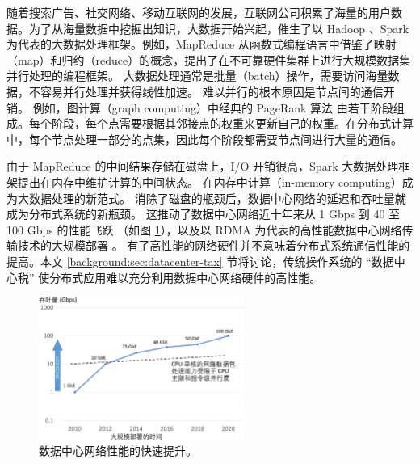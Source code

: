 随着搜索广告、社交网络、移动互联网的发展，互联网公司积累了海量的用户数据。为了从海量数据中挖掘出知识，大数据开始兴起，催生了以 Hadoop \cite{white2012hadoop}、Spark \cite{zaharia2010spark} 为代表的大数据处理框架。例如，MapReduce \cite{dean2008mapreduce} 从函数式编程语言中借鉴了映射（map）和归约（reduce）的概念，提出了在不可靠硬件集群上进行大规模数据集并行处理的编程框架。
大数据处理通常是批量（batch）操作，需要访问海量数据，不容易并行处理并获得线性加速。
难以并行的根本原因是节点间的通信开销。
例如，图计算（graph computing）中经典的 PageRank 算法 \cite{page1999pagerank} 由若干阶段组成。每个阶段，每个点需要根据其邻接点的权重来更新自己的权重。在分布式计算中，每个节点处理一部分的点集，因此每个阶段都需要节点间进行大量的通信。

由于 MapReduce 的中间结果存储在磁盘上，I/O 开销很高，Spark \cite{zaharia2010spark} 大数据处理框架提出在内存中维护计算的中间状态。
在内存中计算（in-memory computing）成为大数据处理的新范式。
消除了磁盘的瓶颈后，数据中心网络的延迟和吞吐量就成为分布式系统的新瓶颈。
这推动了数据中心网络近十年来从 1 Gbps 到 40 至 100 Gbps 的性能飞跃 \cite{al2008scalable}（如图 \ref{background:fig:network-perf-trend}），以及以 RDMA 为代表的高性能数据中心网络传输技术的大规模部署 \cite{guo2016rdma}。
有了高性能的网络硬件并不意味着分布式系统通信性能的提高。本文 \ref{background:sec:datacenter-tax} 节将讨论，传统操作系统的 ``数据中心税'' 使分布式应用难以充分利用数据中心网络硬件的高性能。


\begin{figure}[htbp]
	\centering
	\includegraphics[width=0.6\textwidth]{figures/network_perf_trend.pdf}
	\caption{数据中心网络性能的快速提升。}
	\label{background:fig:network-perf-trend}
\end{figure}



